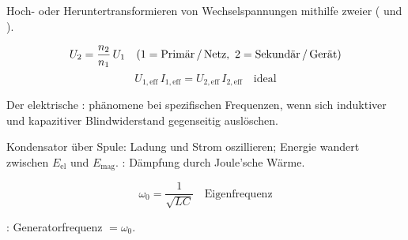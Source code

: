 \begin{runintext}
Hoch- oder Heruntertransformieren von Wechselspannungen mithilfe zweier  ( und ).
\end{runintext}
\begin{formulabox}
\[ U_2 = \frac{n_2}{n_1}\,U_1 \quad (1 = \text{Primär\,/\,Netz},\ 2 = \text{Sekundär\,/\,Gerät}) \]
\formulasep
\[ U_{1,\mathrm{eff}}\,I_{1,\mathrm{eff}} = U_{2,\mathrm{eff}}\,I_{2,\mathrm{eff}} \quad \text{ideal} \]
\end{formulabox}

\begin{runintext}
Der elektrische : phänomene bei spezifischen Frequenzen, wenn sich induktiver und kapazitiver Blindwiderstand gegenseitig auslöschen.
\end{runintext}
\begin{runintext}
Kondensator über Spule: Ladung und Strom oszillieren; Energie wandert zwischen $E_{\mathrm{el}}$ und $E_{\mathrm{mag}}$. : Dämpfung durch Joule'sche Wärme.
\end{runintext}
\begin{formulabox}
\[ \omega_0 = \frac{1}{\sqrt{LC}} \quad \text{Eigenfrequenz} \]
\end{formulabox}
\begin{runintext}
: Generatorfrequenz $= \omega_0$.
\end{runintext}

